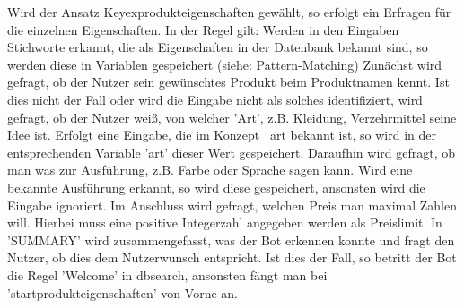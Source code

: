 Wird der Ansatz Keyexprodukteigenschaften gewählt, so erfolgt ein Erfragen für die einzelnen Eigenschaften. In der Regel gilt: Werden in den Eingaben Stichworte erkannt, die als Eigenschaften in der Datenbank bekannt sind, so werden diese in Variablen gespeichert (siehe: Pattern-Matching) Zunächst wird gefragt, ob der Nutzer sein gewünschtes Produkt beim Produktnamen kennt. Ist dies nicht der Fall oder wird die Eingabe nicht als solches identifiziert, wird gefragt, ob der Nutzer weiß, von welcher 'Art', z.B. Kleidung, Verzehrmittel seine Idee ist. Erfolgt eine Eingabe, die im Konzept ~art bekannt ist, so wird in der entsprechenden Variable 'art' dieser Wert gespeichert. 
Daraufhin wird gefragt, ob man was zur Ausführung, z.B. Farbe oder Sprache sagen kann. Wird eine bekannte Ausführung erkannt, so wird diese gespeichert, ansonsten wird die Eingabe ignoriert. 
Im Anschluss wird gefragt, welchen Preis man maximal Zahlen will. Hierbei muss eine positive Integerzahl angegeben werden als Preislimit. 
In 'SUMMARY' wird zusammengefasst, was der Bot erkennen konnte und fragt den Nutzer, ob dies dem Nutzerwunsch entspricht. Ist dies der Fall, so betritt der Bot die Regel 'Welcome' in dbsearch, ansonsten fängt man bei 'startprodukteigenschaften' von Vorne an. 



